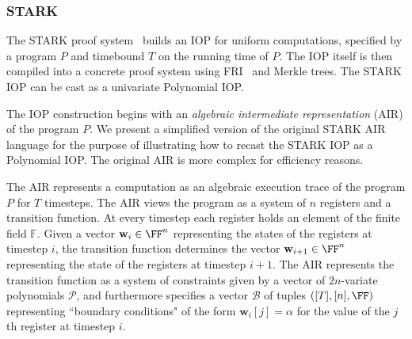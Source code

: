 \subsubsection{STARK}
The \textsf{STARK} proof system~\cite{C:BBHR19} builds an IOP for uniform computations, specified by a program $P$ and timebound $T$ on the running time of $P$. %
The IOP itself is then compiled into a concrete proof system using FRI~\cite{ICALP:BBHR18} and Merkle trees.
The \textsf{STARK} IOP can be cast as a univariate Polynomial IOP. 

The IOP construction begins with an \emph{algebraic intermediate representation} (AIR) of the program $P$.  
We present a simplified version of the original \textsf{STARK} AIR language for the purpose of illustrating how to recast the \textsf{STARK} IOP as a Polynomial IOP.  %
The original AIR is more complex for efficiency reasons.

The AIR represents a computation as an algebraic execution trace of the program $P$ for $T$ timesteps. The AIR views the program as a system of $n$ registers and a transition function. At every timestep each register holds an element of the finite field $\mathbb{F}$. Given a vector $\mathbf{w}_i \in \FF^n$ representing the states of the registers at timestep $i$, the transition function determines the vector $\mathbf{w}_{i+1} \in \FF^n$ representing the state of the registers at timestep $i+1$. The AIR represents the transition function as a system of constraints given by a vector of $2n$-variate polynomials $\boldsymbol{\mathcal{P}}$, and furthermore specifies a vector $\boldsymbol{\mathcal{B}}$ of tuples $([T], [n], \FF)$ representing ``boundary conditions" of the form $\mathbf{w}_i[j] = \alpha$ for the value of the $j$th register at timestep $i$.  


